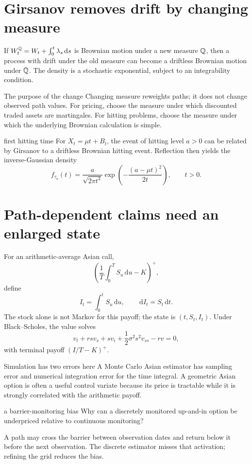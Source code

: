 \documentclass[10pt]{article}
\newcommand{\dd}{\,\mathrm d}\newcommand{\PhiN}{\Phi}
\begin{document}
\section{Girsanov removes drift by changing measure}
If \(W^\Q_t=W_t+\int_0^t\lambda_s\dd s\) is Brownian motion under a new
measure \(\mathbb Q\), then a process with drift under the old measure can become a
driftless Brownian motion under \(\mathbb Q\). The density is a stochastic
exponential, subject to an integrability condition.
\begin{keyidea}{The purpose of the change}
Changing measure reweights paths; it does not change observed path values.
For pricing, choose the measure under which discounted traded assets are
martingales. For hitting problems, choose the measure under which the
underlying Brownian calculation is simple.
\end{keyidea}
\begin{boardexample}{first hitting time}
For \(X_t=\mu t+B_t\), the event of hitting level \(a>0\) can be related by
Girsanov to a driftless Brownian hitting event. Reflection then yields the
inverse-Gaussian density
\[
f_{\tau_a}(t)=\frac{a}{\sqrt{2\pi t^3}}
\exp\left(-\frac{(a-\mu t)^2}{2t}\right),\qquad t>0.
\]
\end{boardexample}

\section{Path-dependent claims need an enlarged state}
For an arithmetic-average Asian call,
\[
\left(\frac1T\int_0^TS_u\dd u-K\right)^+,
\]
define
\[
I_t=\int_0^tS_u\dd u,\qquad \dd I_t=S_t\dd t.
\]
The stock alone is not Markov for this payoff; the state is
\((t,S_t,I_t)\). Under Black--Scholes, the value solves
\[
v_t+rs v_s+s v_i+\frac12\sigma^2s^2v_{ss}-rv=0,
\]
with terminal payoff \((I/T-K)^+\).

\begin{warningbox}{Simulation has two errors here}
A Monte Carlo Asian estimator has sampling error and numerical integration
error for the time integral. A geometric Asian option is often a useful
control variate because its price is tractable while it is strongly
correlated with the arithmetic payoff.
\end{warningbox}
\begin{studentexercise}{a barrier-monitoring bias}
Why can a discretely monitored up-and-in option be underpriced relative to
continuous monitoring?
\end{studentexercise}
\begin{shortsolution}
A path may cross the barrier between observation dates and return below it
before the next observation. The discrete estimator misses that activation;
refining the grid reduces the bias.
\end{shortsolution}
\end{document}
